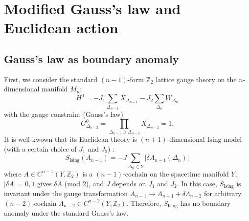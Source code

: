 \documentclass[12pt]{article}
\newcommand{\ZZ}{{\mathbb Z}}
\newcommand{\ra}{\rightarrow}
\begin{document}
\section{Modified Gauss's law and Euclidean action}

\subsection{Gauss's law as boundary anomaly}

First, we consider the standard $(n-1)$-form $\ZZ_2$ lattice gauge theory on the $n$-dimensional manifold $M_n$:
\begin{equation}
    H^0 = - J_1 \sum_{\Delta_{n-1}} X_{\Delta_{n-1}} - J_2 \sum_{\Delta_n} W_{\Delta_n}
\end{equation}
with the gauge constraint (Gauss's law)
\begin{equation}
    G^0_{\Delta_{n-2}} = \prod_{\Delta_{n-1} \supset \Delta_{n-2}} X_{\Delta_{n-2}}=1.
\end{equation}
It is well-kwown that its Euclidean theory is $(n+1)$-dimensional Ising model (with a certain choice of $J_1$ and $J_2$) \cite{K79}:
\begin{equation}
    S_{\text{Ising}} (A_{n-1}) = -J \sum_{\Delta_{n} \subset Y} |\delta A_{n-1} (\Delta_{n})|
\end{equation}
where $A \in C^{n-1}(Y,\ZZ_2)$ is a $(n-1)$-cochain on the spacetime manifold $Y$, $|\delta A| = 0, 1$ gives $\delta A$ (mod $2$), and $J$ depends on $J_1$ and $J_2$. In this case, $S_{\text{Ising}}$ is invariant under the gauge transformation $A_{n-1} \ra A_{n-1} + \delta \Lambda_{n-2}$ for arbitrary $(n-2)$-cochain $\Lambda_{n-2} \in C^{n-2}(Y,\ZZ_2)$. Therefore, $S_{\text{Ising}}$ has no boundary anomaly under the standard Gauss's law.
\end{document}
